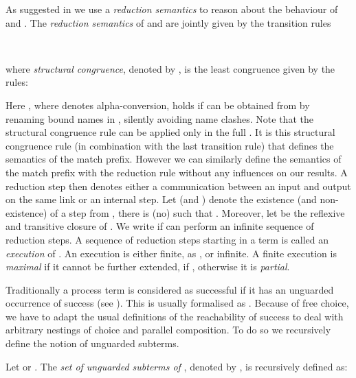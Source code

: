 \documentclass[final,copyright,creativecommons]{eptcs}
\begin{document}
As suggested in \cite{gorla} we use a \emph{reduction semantics} to reason about the behaviour of \piT and \piNM.
The \emph{reduction semantics} of \piT and \piNM are jointly given by the transition rules\vspace{0.75em}
\begin{center}
	\vspace{0.75em}\\
	\vspace{0.75em}
\end{center}
where \emph{structural congruence}, denoted by , is the least congruence given by the rules:\vspace{0.75em}

Here , where  denotes alpha-conversion, holds if  can be obtained from  by renaming bound names in , silently avoiding name clashes.
Note that the structural congruence rule  can be applied only in the full \piCal. It is this structural congruence rule (in combination with the last transition rule) that defines the semantics of the match prefix. However we can similarly define the semantics of the match prefix with the reduction rule  without any influences on our results.
A reduction step  then denotes either a communication between an input and output on the same link or an internal step.
Let  (and ) denote the existence (and non-existence) of a step from , \ie there is (no)  such that . Moreover, let  be the reflexive and transitive closure of . We write  if  can perform an infinite sequence of reduction steps. A sequence of reduction steps starting in a term  is called an \emph{execution} of . An execution is either finite, as , or infinite. A finite execution  is \emph{maximal} if it cannot be further extended, \ie if , otherwise it is \emph{partial}.

Traditionally a process term is considered as successful if it has an unguarded occurrence of success (see \eg \cite{gorla}). This is usually formalised as . Because of free choice, we have to adapt the usual definitions of the reachability of success to deal with arbitrary nestings of choice and parallel composition. To do so we recursively define the notion of unguarded subterms.

\begin{definition}
	\label{def:unguardedSubterms}
	Let  or . The \emph{set of unguarded subterms of} , denoted by , is recursively defined as:
	\vspace*{-0.6em}
	
	\vspace*{-1.1em}
\end{definition}
\end{document}
